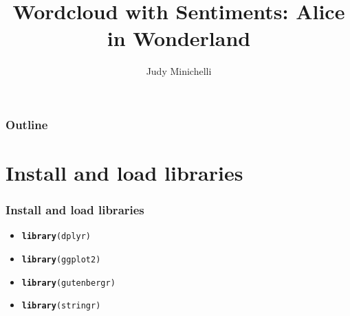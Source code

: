 \documentclass{beamer}\usepackage[]{graphicx}\usepackage[]{color}
\makeatletter
\newcommand{\hlstd}[1]{\textcolor[rgb]{0.345,0.345,0.345}{#1}}%
\newcommand{\hlkwd}[1]{\textcolor[rgb]{0.737,0.353,0.396}{\textbf{#1}}}%
\newenvironment{kframe}{%
 \def\at@end@of@kframe{}%
 \ifinner\ifhmode%
  \def\at@end@of@kframe{\end{minipage}}%
  \begin{minipage}{\columnwidth}%
 \fi\fi%
 \def\FrameCommand##1{\hskip\@totalleftmargin \hskip-\fboxsep
 \colorbox{shadecolor}{##1}\hskip-\fboxsep
     \hskip-\linewidth \hskip-\@totalleftmargin \hskip\columnwidth}%
 \MakeFramed {\advance\hsize-\width
   \@totalleftmargin\z@ \linewidth\hsize
   \@setminipage}}%
 {\par\unskip\endMakeFramed%
 \at@end@of@kframe}
\newenvironment{knitrout}{}{} %
\makeatother
\begin{document}
\title{Wordcloud with Sentiments: Alice in Wonderland}
\author{Judy Minichelli}

\begin{frame}
  \titlepage
\end{frame}

\begin{frame}[fragile]
  \frametitle{Outline}
   \tableofcontents
\end{frame}

\section{Install and load libraries}
\begin{frame}[fragile]
  \frametitle{Install and load libraries}
   \begin{itemize}
    \item<1->
\begin{knitrout}
\color{fgcolor}\begin{kframe}
\begin{alltt}
\hlkwd{library}\hlstd{(dplyr)}
\end{alltt}
\end{kframe}
\end{knitrout}
     \item<2->
\begin{knitrout}
\color{fgcolor}\begin{kframe}
\begin{alltt}
\hlkwd{library}\hlstd{(ggplot2)}
\end{alltt}
\end{kframe}
\end{knitrout}
     \item<3->
\begin{knitrout}
\color{fgcolor}\begin{kframe}
\begin{alltt}
\hlkwd{library}\hlstd{(gutenbergr)}
\end{alltt}
\end{kframe}
\end{knitrout}
     \item<4->
\begin{knitrout}
\color{fgcolor}\begin{kframe}
\begin{alltt}
\hlkwd{library}\hlstd{(stringr)}
\end{alltt}

\end{kframe}
\end{knitrout}
\end{itemize}
\end{frame}
\end{document}
